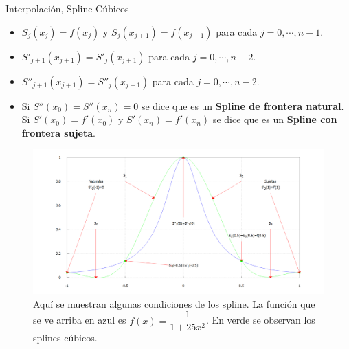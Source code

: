 \begin{frame}[allowframebreaks]{Interpolación, Spline Cúbicos}
\begin{itemize}
\item $S_j(x_j)=f(x_j)$ y $S_{j}(x_{j+1})=f(x_{j+1})$ para cada $j=0,\cdots, n-1$.
\item $S'_{j+1}(x_{j+1})=S'_{j}(x_{j+1})$ para cada $j=0,\cdots, n-2$.
\item $S''_{j+1}(x_{j+1})=S''_{j}(x_{j+1})$ para cada $j=0,\cdots, n-2$.
\item Si $S''(x_0)=S''(x_n)=0$ se dice que es un \textbf{Spline de frontera natural}. Si $S'(x_0)=f'(x_0)$ y $S'(x_n)=f'(x_n)$ se dice que es un \textbf{Spline con frontera sujeta}. 
\end{itemize}
\begin{figure}
\begin{center}
\includegraphics[scale=0.4]{Imagen22}
\end{center}
\caption{Aquí se muestran algunas condiciones de los spline. La función que se ve arriba en azul es $f(x)=\dfrac{1}{1+25x^2}$. En verde se observan los splines cúbicos.}
\end{figure}
\end{frame}
